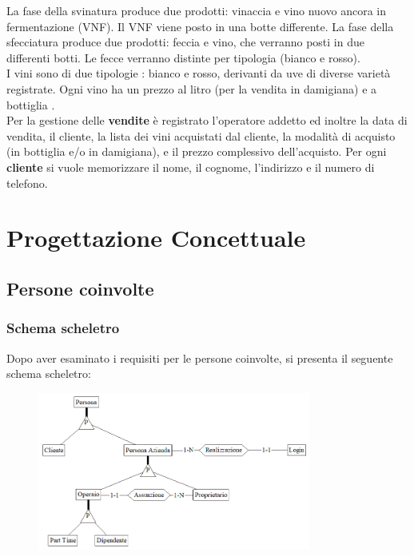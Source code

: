 \documentclass{article}
\begin{document}
{La fase della svinatura produce due prodotti: vinaccia e vino nuovo ancora in fermentazione (VNF). Il VNF viene posto in una botte differente. 
La fase della sfecciatura produce due prodotti: feccia e vino, che verranno posti in due differenti botti. Le fecce verranno distinte per tipologia (bianco e rosso).\\
I vini sono di due tipologie : bianco e rosso, derivanti da uve di diverse varietà registrate. Ogni vino ha un prezzo al litro (per la vendita in damigiana) e a bottiglia .\\\newline
Per la gestione delle \textbf{vendite} è registrato l'operatore addetto ed inoltre la data di vendita, il cliente, la lista dei vini acquistati dal cliente, la modalità di acquisto (in bottiglia e/o in damigiana), e il prezzo complessivo dell'acquisto. Per ogni \textbf{cliente} si vuole memorizzare il nome, il cognome, l'indirizzo e il numero di telefono.}
\newpage
\section{Progettazione Concettuale}
\subsection{Persone coinvolte}
\subsubsection{Schema scheletro}
Dopo aver esaminato i requisiti per le persone coinvolte, si presenta il seguente schema scheletro:
\begin{figure}[htbp]
\centering
\includegraphics[width=0.8\textwidth]{img/Persone_Scheletro.png}
\end{figure}
\end{document}
